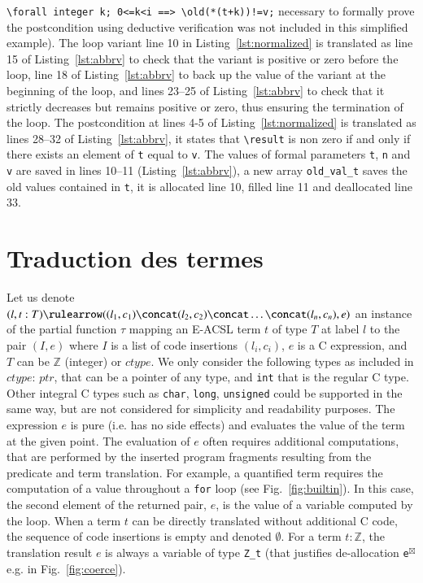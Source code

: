\lstinline|\forall integer k; 0<=k<i ==> \old(*(t+k))!=v;|
necessary to formally prove the postcondition using deductive verification
was not included in this simplified example).
The loop variant line 10 in Listing~\ref{lst:normalized} is translated as
line 15 of Listing~\ref{lst:abbrv} to check that the variant is positive or
zero before the loop, line 18 of Listing~\ref{lst:abbrv} to back up the
value of the variant at the beginning of the loop, and lines 23--25 of
Listing~\ref{lst:abbrv} to check that it strictly decreases but remains positive
or zero, thus ensuring the termination of the loop.
The postcondition at lines 4-5 of Listing~\ref{lst:normalized} is translated as
lines 28--32 of Listing~\ref{lst:abbrv}, it states that \lstinline|\result| is
non zero if and only if there exists an element of \lstinline|t| equal
to \lstinline|v|.
The values of formal parameters \lstinline|t|, \lstinline|n| and
\lstinline|v|
are saved in lines 10--11
(Listing~\ref{lst:abbrv}), a new array \lstinline|old_val_t| saves the old values
contained in \lstinline|t|, it is allocated line 10, filled line 11 and
deallocated line 33.



\section{Traduction des termes \acsl}
\label{sec:term}



Let us denote
$(l, t:T) \rulearrow ((l_1, c_1) \concat (l_2, c_2) \concat \ldots \concat (l_n, c_n), e)$
an instance of the partial function $\tau$ mapping an E-ACSL term $t$ of type
$T$ at label $l$ to the pair $(I, e)$ where $I$ is a list of code insertions
$(l_i, c_i)$, $e$ is a C expression, and $T$ can be $\mathbb{Z}$ (integer) or
$ctype$. We only consider
the following types as included in $ctype$: $ptr$,
that can be a pointer of any type, and \lstinline'int' that is the regular C
type. Other integral C types such as \lstinline'char', \lstinline'long',
\lstinline'unsigned' could be supported in the same way, but are not considered
for simplicity and readability purposes.
The expression $e$ is pure (i.e. has no side
effects) and evaluates the value of the term at the given point.
The evaluation of $e$ often requires additional
computations, that are performed by the inserted program fragments
resulting from the predicate and term translation. For example, a quantified
term requires the computation of a value throughout a \lstinline|for| loop
(see Fig.~\ref{fig:builtin}). In this case, the second element of the returned
pair, $e$, is the value of a variable computed by the loop.
When a term $t$ can be directly translated without additional C code, 
the sequence of code insertions is empty and denoted $\emptyset$.
For a term $t:\mathbb{Z}$,
the translation result $e$ is always a variable of type \lstinline'Z_t'
(that justifies de-allocation \lstinline{e}${}^{\boxtimes}$ e.g. in Fig.~\ref{fig:coerce}).

